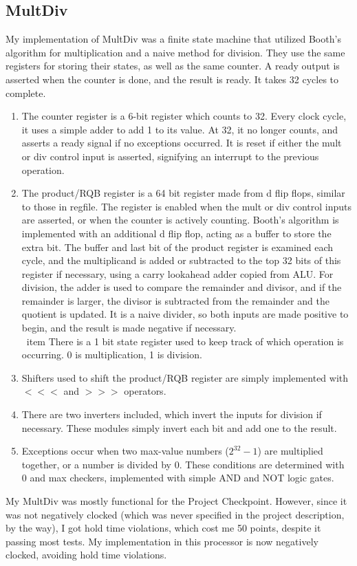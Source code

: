\documentclass[letterpaper]{article} %
\begin{document}
\subsection*{MultDiv}
My implementation of MultDiv was a finite state machine that utilized Booth's algorithm for multiplication and a naive method for division. They use the same registers for storing their states, as well as the same counter. A ready output is asserted when the counter is done, and the result is ready. It takes 32 cycles to complete. \\
\begin{enumerate}
\item The counter register is a 6-bit register which counts to 32. Every clock cycle, it uses a simple adder to add 1 to its value. At 32, it no longer counts, and asserts a ready signal if no exceptions occurred. It is reset if either the mult or div control input is asserted, signifying an interrupt to the previous operation. \\
\item The product/RQB register is a 64 bit register made from d flip flops, similar to those in regfile. The register is enabled when the mult or div control inputs are asserted, or when the counter is actively counting. Booth's algorithm is implemented with an additional d flip flop, acting as a buffer to store the extra bit. The buffer and last bit of the product register is examined each cycle, and the multiplicand is added or subtracted to the top 32 bits of this register if necessary, using a carry lookahead adder copied from ALU. For division, the adder is used to compare the remainder and divisor, and if the remainder is larger, the divisor is subtracted from the remainder and the quotient is updated. It is a naive divider, so both inputs are made positive to begin, and the result is made negative if necessary. \\
\ item There is a 1 bit state register used to keep track of which operation is occurring. 0 is multiplication, 1 is division. \\
\item Shifters used to shift the product/RQB register are simply implemented with $<<<$ and $>>>$ operators. \\
\item There are two inverters included, which invert the inputs for division if necessary. These modules simply invert each bit and add one to the result.
\item Exceptions occur when two max-value numbers (\(2^{32}-1\)) are multiplied together, or a number is divided by 0. These conditions are determined with 0 and max checkers, implemented with simple AND and NOT logic gates. \\
\end{enumerate}
My MultDiv was mostly functional for the Project Checkpoint. However, since it was not negatively clocked (which was never specified in the project description, by the way), I got hold time violations, which cost me 50 points, despite it passing most tests. My implementation in this processor is now negatively clocked, avoiding hold time violations. \\
\end{document}
